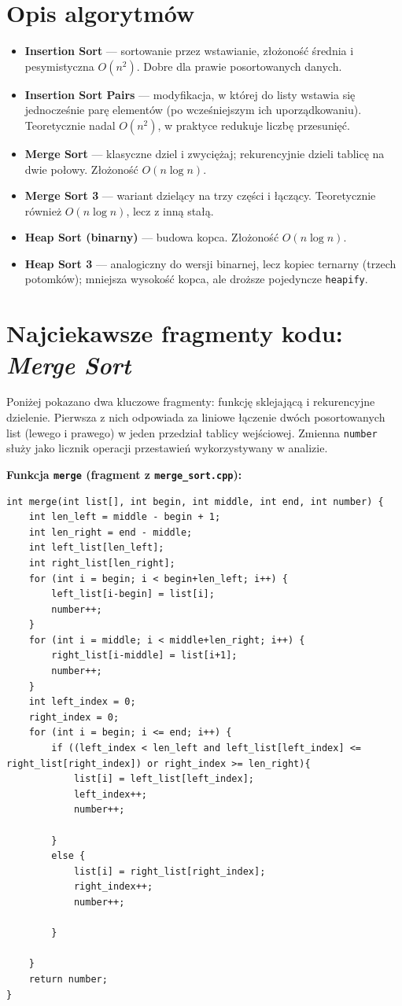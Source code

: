 \documentclass[11pt,a4paper]{article}
\begin{document}
\section{Opis algorytmów}
\begin{itemize}
  \item \textbf{Insertion Sort} --- sortowanie przez wstawianie, złożoność średnia i pesymistyczna $O(n^2)$. Dobre dla prawie posortowanych danych.
  \item \textbf{Insertion Sort Pairs} --- modyfikacja, w której do listy wstawia się jednocześnie parę elementów (po wcześniejszym ich uporządkowaniu). Teoretycznie nadal $O(n^2)$, w praktyce redukuje liczbę przesunięć.
  \item \textbf{Merge Sort} --- klasyczne dziel i zwyciężaj; rekurencyjnie dzieli tablicę na dwie połowy. Złożoność $O(n\log n)$.
  \item \textbf{Merge Sort 3} --- wariant dzielący na trzy części i łączący. Teoretycznie również $O(n\log n)$, lecz z inną stałą.
  \item \textbf{Heap Sort (binarny)} --- budowa kopca. Złożoność $O(n\log n)$.
  \item \textbf{Heap Sort 3} --- analogiczny do wersji binarnej, lecz kopiec ternarny (trzech potomków); mniejsza wysokość kopca, ale droższe pojedyncze \texttt{heapify}.
\end{itemize}

\section{Najciekawsze fragmenty kodu: \emph{Merge Sort}}
Poniżej pokazano dwa kluczowe fragmenty: funkcję sklejającą i rekurencyjne dzielenie. Pierwsza z nich odpowiada za liniowe łączenie dwóch posortowanych list (lewego i prawego) w jeden przedział tablicy wejściowej. Zmienna \texttt{number} służy jako licznik operacji przestawień wykorzystywany w analizie.
\medskip

\noindent\textbf{Funkcja \texttt{merge} (fragment z \texttt{merge\_sort.cpp}):}
\begin{lstlisting}[style=cppstyle,caption={Sklejanie dwóch przedziałów w Merge Sort.},label={lst:merge}]
int merge(int list[], int begin, int middle, int end, int number) {
    int len_left = middle - begin + 1;
    int len_right = end - middle;
    int left_list[len_left];
    int right_list[len_right];
    for (int i = begin; i < begin+len_left; i++) {
        left_list[i-begin] = list[i];
        number++;
    }
    for (int i = middle; i < middle+len_right; i++) {
        right_list[i-middle] = list[i+1];
        number++;
    }
    int left_index = 0;
    right_index = 0;
    for (int i = begin; i <= end; i++) {
    	if ((left_index < len_left and left_list[left_index] <= right_list[right_index]) or right_index >= len_right){
    		list[i] = left_list[left_index];
    		left_index++;
    		number++;
    		
    	}
    	else {
    		list[i] = right_list[right_index]; 
    		right_index++;
    		number++;
    		
    	}
    	
    }
    return number;
}
\end{lstlisting}
\end{document}
